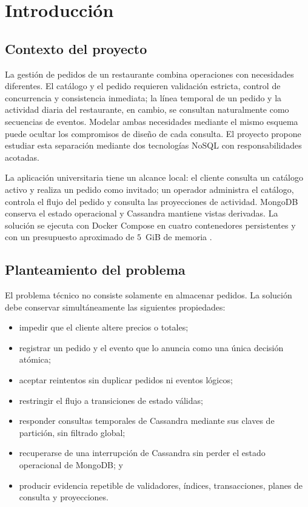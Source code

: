 \chapter{Introducción}
\label{chap:introduccion}

\section{Contexto del proyecto}

La gestión de pedidos de un restaurante combina operaciones con necesidades diferentes. El catálogo y el pedido requieren validación estricta, control de concurrencia y consistencia inmediata; la línea temporal de un pedido y la actividad diaria del restaurante, en cambio, se consultan naturalmente como secuencias de eventos. Modelar ambas necesidades mediante el mismo esquema puede ocultar los compromisos de diseño de cada consulta. El proyecto propone estudiar esta separación mediante dos tecnologías NoSQL con responsabilidades acotadas.

La aplicación universitaria tiene un alcance local: el cliente consulta un catálogo activo y realiza un pedido como invitado; un operador administra el catálogo, controla el flujo del pedido y consulta las proyecciones de actividad. MongoDB conserva el estado operacional y Cassandra mantiene vistas derivadas. La solución se ejecuta con Docker Compose en cuatro contenedores persistentes y con un presupuesto aproximado de \(5\)~GiB de memoria \parencite{proyectoOpenSpec}.

\section{Planteamiento del problema}

El problema técnico no consiste solamente en almacenar pedidos. La solución debe conservar simultáneamente las siguientes propiedades:

\begin{itemize}
  \item impedir que el cliente altere precios o totales;
  \item registrar un pedido y el evento que lo anuncia como una única decisión atómica;
  \item aceptar reintentos sin duplicar pedidos ni eventos lógicos;
  \item restringir el flujo a transiciones de estado válidas;
  \item responder consultas temporales de Cassandra mediante sus claves de partición, sin filtrado global;
  \item recuperarse de una interrupción de Cassandra sin perder el estado operacional de MongoDB; y
  \item producir evidencia repetible de validadores, índices, transacciones, planes de consulta y proyecciones.
\end{itemize}

